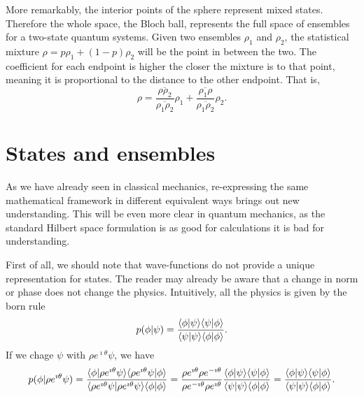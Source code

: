 More remarkably, the interior points of the sphere represent mixed states. Therefore the whole space, the Bloch ball, represents the full space of ensembles for a two-state quantum systems. Given two ensembles $\rho_1$ and $\rho_2$, the statistical mixture $\rho = p \rho_1 + (1-p) \rho_2$ will be the point in between the two. The coefficient for each endpoint is higher the closer the mixture is to that point, meaning it is proportional to the distance to the other endpoint. That is,
\begin{equation}
	\rho = \frac{\overline{\rho \rho_2}}{\overline{\rho_1 \rho_2}} \rho_1 + \frac{\overline{\rho_1 \rho}}{\overline{\rho_1 \rho_2}} \rho_2.
\end{equation}

\section{States and ensembles}

As we have already seen in classical mechanics, re-expressing the same mathematical framework in different equivalent ways brings out new understanding. This will be even more clear in quantum mechanics, as the standard Hilbert space formulation is as good for calculations it is bad for understanding.

First of all, we should note that wave-functions do not provide a unique representation for states. The reader may already be aware that a change in norm or phase does not change the physics. Intuitively, all the physics is given by the born rule
\begin{equation}
	p(\phi|\psi) = \frac{\langle \phi | \psi \rangle\langle \psi | \phi \rangle}{\langle \psi | \psi \rangle\langle \phi | \phi \rangle}.
\end{equation}
If we chage $\psi$ with $\rho e^{\imath \theta} \psi$, we have
\begin{equation}
	p(\phi|\rho e^{\imath \theta}\psi) = \frac{\langle \phi |\rho e^{\imath \theta}\psi \rangle\langle\rho e^{\imath \theta}\psi | \phi \rangle}{\langle \rho e^{\imath \theta}\psi | \rho e^{\imath \theta}\psi \rangle\langle \phi | \phi \rangle} = \frac{\rho e^{\imath \theta}\rho e^{-\imath \theta}}{\rho e^{-\imath \theta}\rho e^{\imath \theta}}\frac{\langle \phi | \psi \rangle\langle \psi | \phi \rangle}{\langle \psi | \psi \rangle\langle \phi | \phi \rangle}=\frac{\langle \phi | \psi \rangle\langle \psi | \phi \rangle}{\langle \psi | \psi \rangle\langle \phi | \phi \rangle}.
\end{equation}

